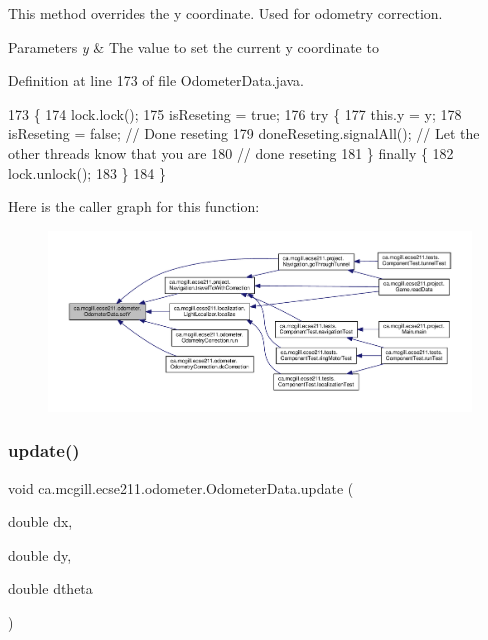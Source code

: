 This method overrides the y coordinate. Used for odometry correction.


\begin{DoxyParams}{Parameters}
{\em y} & The value to set the current y coordinate to \\
\hline
\end{DoxyParams}


Definition at line 173 of file Odometer\+Data.\+java.


\begin{DoxyCode}
173                              \{
174     lock.lock();
175     isReseting = \textcolor{keyword}{true};
176     \textcolor{keywordflow}{try} \{
177       this.y = y;
178       isReseting = \textcolor{keyword}{false}; \textcolor{comment}{// Done reseting}
179       doneReseting.signalAll(); \textcolor{comment}{// Let the other threads know that you are}
180                                 \textcolor{comment}{// done reseting}
181     \} \textcolor{keywordflow}{finally} \{
182       lock.unlock();
183     \}
184   \}
\end{DoxyCode}
Here is the caller graph for this function\+:
\nopagebreak
\begin{figure}[H]
\begin{center}
\leavevmode
\includegraphics[width=350pt]{classca_1_1mcgill_1_1ecse211_1_1odometer_1_1_odometer_data_a82986438cd462e66520bc62bb4bd2b75_icgraph}
\end{center}
\end{figure}
\mbox{\label{classca_1_1mcgill_1_1ecse211_1_1odometer_1_1_odometer_data_aaa06f190d634299fcb1b97a1891dad85}} 
\subsubsection{\texorpdfstring{update()}{update()}}
{\footnotesize\ttfamily void ca.\+mcgill.\+ecse211.\+odometer.\+Odometer\+Data.\+update (\begin{DoxyParamCaption}\item[{double}]{dx,  }\item[{double}]{dy,  }\item[{double}]{dtheta }\end{DoxyParamCaption})}

